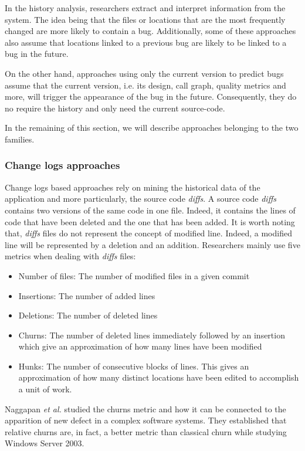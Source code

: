 In the history analysis, researchers extract and interpret information from  the system.
The idea being that the files or locations that are the most frequently changed are more likely to contain a bug.
Additionally, some of these approaches also assume that locations linked to a previous bug are likely to be linked to a bug in the future.

On the other hand, approaches using only the current version to predict bugs assume that the current version, i.e. its design, call graph, quality metrics and more, will trigger the appearance of the bug in the future.
Consequently, they do no require the history and only need the current source-code.

In the remaining of this section, we will describe approaches belonging to the two families.

\subsubsection{Change logs approaches}
\label{subs:Change logs approaches}

Change logs based approaches rely on mining the historical data of the application and more particularly, the source code \textit{diffs}.
A source code \textit{diffs} contains two versions of the same code in one file.
Indeed, it contains the lines of code that have been deleted and the one that has been added.
It is worth noting that, \textit{diffs} files do not represent the concept of modified line.
Indeed, a modified line will be represented by a deletion and an addition.
Researchers mainly use five metrics when dealing with \textit{diffs} files:

\begin{itemize}
  \item Number of files: The number of modified files in a given commit
  \item Insertions: The number of added lines
  \item Deletions: The number of deleted lines
  \item Churns: The number of deleted lines immediately followed by an insertion which give an approximation of how many lines have been modified
  \item Hunks: The number of consecutive blocks of lines. This gives an approximation of how many distinct locations have been edited to accomplish a unit of work.
\end{itemize}

Naggapan \textit{et al.} studied the churns metric and how it can be connected to the apparition of new defect in a complex software systems.
They established that relative churns are, in fact, a better metric than classical churn \cite{Nagappan} while studying Windows Server 2003.

